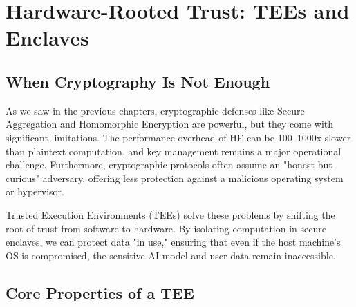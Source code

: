 
\chapter{Hardware-Rooted Trust: TEEs and Enclaves}
\label{chap:tees_enclaves}


\section{When Cryptography Is Not Enough}
\label{sec:crypto_limitations}

As we saw in the previous chapters, cryptographic defenses like Secure Aggregation and Homomorphic Encryption are powerful, but they come with significant limitations. The performance overhead of HE can be 100--1000x slower than plaintext computation, and key management remains a major operational challenge. Furthermore, cryptographic protocols often assume an "honest-but-curious" adversary, offering less protection against a malicious operating system or hypervisor.

Trusted Execution Environments (TEEs) solve these problems by shifting the root of trust from software to hardware. By isolating computation in secure enclaves, we can protect data "in use," ensuring that even if the host machine's OS is compromised, the sensitive AI model and user data remain inaccessible.

\section{Core Properties of a TEE}
\label{sec:tee_properties}

